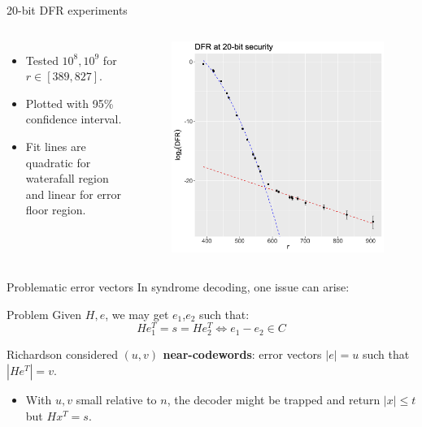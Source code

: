 \begin{frame}{20-bit DFR experiments}

\begin{columns}

\begin{itemize}
    \item Tested $10^8, 10^9$ for $r \in [389, 827]$.
    \item Plotted with 95\% confidence interval.
    \item Fit lines are quadratic for waterafall region and linear for error floor region.
\end{itemize}

\begin{figure}
    \centering
    \includegraphics[scale=.07]{Images/DFR-plot-T3.png}
\end{figure}

\end{columns}
    
\end{frame}

\begin{frame}{Problematic error vectors}
In syndrome decoding, one issue can arise:

\begin{block}{Problem}
Given $H,e$, we may get $e_1$,$e_2$ such that:
     \[  He_1^T = s = He_2^T \iff e_1- e_2 \in C\]

    
\end{block}
Richardson considered \textbf{$(u,v)$ near-codewords}: error vectors $|e| = u$ such that $|He^T| = v$. 
    
    \begin{itemize}
        \item With $u,v$ small relative to $n$, the decoder might be trapped and return $|x| \leq t$ but $Hx^T = s$.
    \end{itemize}
    

\end{frame}



